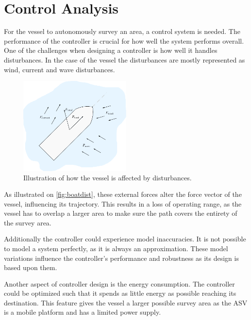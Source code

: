 \section{Control Analysis}
For the vessel to autonomously survey an area, a control system is needed. 
The performance of the controller is crucial for how well the system performs overall. 
One of the challenges when designing a controller is how well it handles disturbances. 
In the case of the vessel the disturbances are mostly represented as wind, current and wave disturbances. 
\begin{figure}[H]
    \includegraphics[width=0.5\textwidth]{figures/boatdisturbance}
    \caption{Illustration of how the vessel is affected by disturbances.}
    \label{fig:boatdist}
\end{figure}

As illustrated on \autoref{fig:boatdist}, these external forces alter the force vector of the vessel, influencing its trajectory. This results in a loss of operating range, as the vessel has to overlap a larger area to make sure the path covers the entirety of the survey area.

Additionally the controller could experience model inaccuracies. 
It is not possible to model a system perfectly, as it is always an approximation. 
These model variations influence the controller's performance and robustness as its design is based upon them. 

Another aspect of controller design is the energy consumption. The controller could be optimized such that it spends as little energy as possible reaching its destination. This feature gives the vessel a larger possible survey area as the ASV is a mobile platform and has a limited power supply. 


